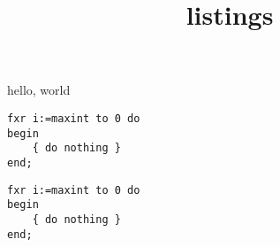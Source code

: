 \documentclass{amsart}
\title{listings}
\begin{document}
\maketitle

hello, world


\ifTeXML

\def\EBF{\unskip\endXMLelement{keyword}}

\def\bf{\startXMLelement{keyword}\aftergroup\EBF\ignorespaces}

\makeatletter
\def\lst@NewLine{%
    \ifx\lst@OutputBox\@gobble\else
        \par\noindent
        \ifinXMLelement{line}\endXMLelement{line}\fi
        \UnicodeLineFeed\startXMLelement{line}%
    \fi
    \global\advance\lst@newlines\m@ne
    \lst@newlinetrue}

\def\lst@PlaceNumber{%
    \XMLelement{lineno}{\thelstnumber}%
}

\makeatother

\fi


\xmlpartag{}

\begin{lstlisting}
fxr i:=maxint to 0 do
begin
    { do nothing }
end;
\end{lstlisting}

\begin{lstlisting}
fxr i:=maxint to 0 do
begin
    { do nothing }
end;
\end{lstlisting}
\end{document}
